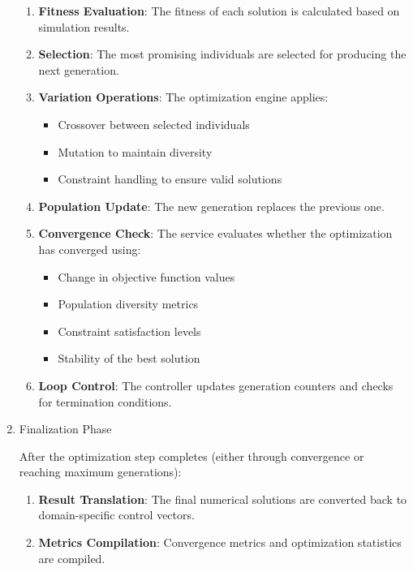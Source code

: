\begin{enumerate}
\begin{enumerate}
	\item \textbf{Fitness Evaluation}: The fitness of each solution is calculated based on simulation results.

	\item \textbf{Selection}: The most promising individuals are selected for producing the next generation.

	\item \textbf{Variation Operations}: The optimization engine applies:
	\begin{itemize}
		\item Crossover between selected individuals
		\item Mutation to maintain diversity
		\item Constraint handling to ensure valid solutions
	\end{itemize}

	\item \textbf{Population Update}: The new generation replaces the previous one.

	\item \textbf{Convergence Check}: The service evaluates whether the optimization has converged using:
	\begin{itemize}
		\item Change in objective function values
		\item Population diversity metrics
		\item Constraint satisfaction levels
		\item Stability of the best solution
	\end{itemize}

	\item \textbf{Loop Control}: The controller updates generation counters and checks for termination conditions.
\end{enumerate}

\item Finalization Phase

After the optimization step completes (either through convergence or reaching maximum generations):

\begin{enumerate}
	\item \textbf{Result Translation}: The final numerical solutions are converted back to domain-specific control vectors.

	\item \textbf{Metrics Compilation}: Convergence metrics and optimization statistics are compiled.


\end{enumerate}
\end{enumerate}
